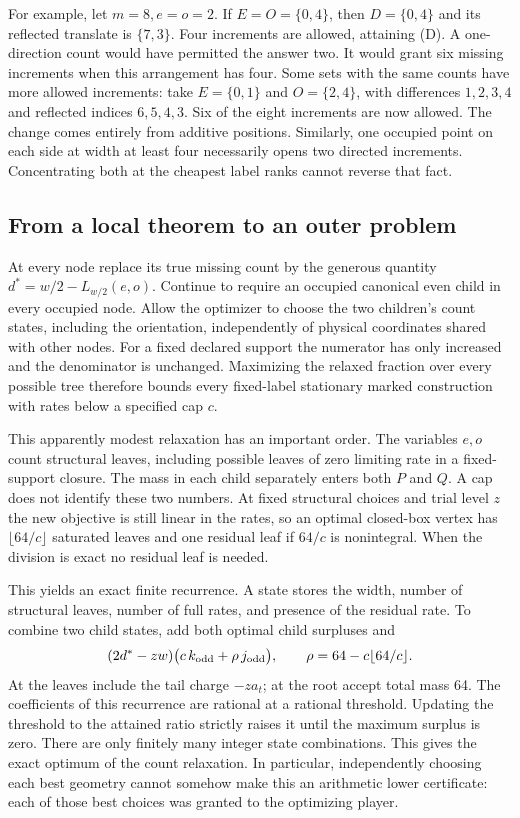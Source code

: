 \documentclass[12pt,letterpaper]{article}
\begin{document}
For example, let \(m=8,e=o=2\). If \(E=O=\{0,4\}\), then \(D=\{0,4\}\) and its reflected translate is \(\{7,3\}\). Four increments are allowed, attaining (D). A one-direction count would have permitted the answer two. It would grant six missing increments when this arrangement has four. Some sets with the same counts have more allowed increments: take \(E=\{0,1\}\) and \(O=\{2,4\}\), with differences \(1,2,3,4\) and reflected indices \(6,5,4,3\). Six of the eight increments are now allowed. The change comes entirely from additive positions. Similarly, one occupied point on each side at width at least four necessarily opens two directed increments. Concentrating both at the cheapest label ranks cannot reverse that fact.

\subsection{From a local theorem to an outer problem}
At every node replace its true missing count by the generous quantity \(d^*=w/2-L_{w/2}(e,o)\). Continue to require an occupied canonical even child in every occupied node. Allow the optimizer to choose the two children's count states, including the orientation, independently of physical coordinates shared with other nodes. For a fixed declared support the numerator has only increased and the denominator is unchanged. Maximizing the relaxed fraction over every possible tree therefore bounds every fixed-label stationary marked construction with rates below a specified cap \(c\).

This apparently modest relaxation has an important order. The variables \(e,o\) count structural leaves, including possible leaves of zero limiting rate in a fixed-support closure. The mass in each child separately enters both \(P\) and \(Q\). A cap does not identify these two numbers. At fixed structural choices and trial level \(z\) the new objective is still linear in the rates, so an optimal closed-box vertex has \(\lfloor64/c\rfloor\) saturated leaves and one residual leaf if \(64/c\) is nonintegral. When the division is exact no residual leaf is needed.

This yields an exact finite recurrence. A state stores the width, number of structural leaves, number of full rates, and presence of the residual rate. To combine two child states, add both optimal child surpluses and
\[
 (2d^*-zw)\bigl(c\,k_{\rm odd}+
                    \rho\,j_{\rm odd}\bigr),\qquad
 \rho=64-c\lfloor64/c\rfloor .
\]
At the leaves include the tail charge \(-za_t\); at the root accept total mass 64. The coefficients of this recurrence are rational at a rational threshold. Updating the threshold to the attained ratio strictly raises it until the maximum surplus is zero. There are only finitely many integer state combinations. This gives the exact optimum of the count relaxation. In particular, independently choosing each best geometry cannot somehow make this an arithmetic lower certificate: each of those best choices was granted to the optimizing player.
\end{document}

